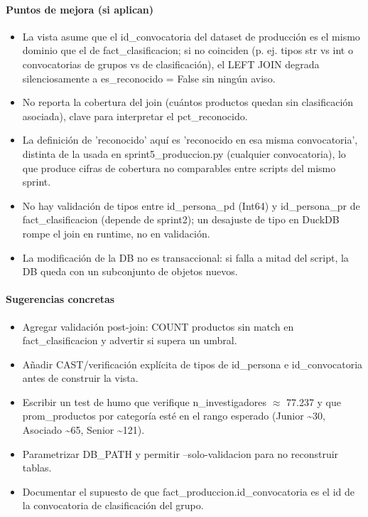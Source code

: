 \paragraph{Puntos de mejora (si aplican)}
\begin{itemize}
  \item La vista asume que el id\_convocatoria del dataset de producción es el mismo dominio que el de fact\_clasificacion; si no coinciden (p. ej. tipos str vs int o convocatorias de grupos vs de clasificación), el LEFT JOIN degrada silenciosamente a es\_reconocido = False sin ningún aviso.
  \item No reporta la cobertura del join (cuántos productos quedan sin clasificación asociada), clave para interpretar el pct\_reconocido.
  \item La definición de 'reconocido' aquí es 'reconocido en esa misma convocatoria', distinta de la usada en sprint5\_produccion.py (cualquier convocatoria), lo que produce cifras de cobertura no comparables entre scripts del mismo sprint.
  \item No hay validación de tipos entre id\_persona\_pd (Int64) y id\_persona\_pr de fact\_clasificacion (depende de sprint2); un desajuste de tipo en DuckDB rompe el join en runtime, no en validación.
  \item La modificación de la DB no es transaccional: si falla a mitad del script, la DB queda con un subconjunto de objetos nuevos.
\end{itemize}

\paragraph{Sugerencias concretas}
\begin{itemize}
  \item Agregar validación post-join: COUNT productos sin match en fact\_clasificacion y advertir si supera un umbral.
  \item Añadir CAST/verificación explícita de tipos de id\_persona e id\_convocatoria antes de construir la vista.
  \item Escribir un test de humo que verifique n\_investigadores $\approx$ 77.237 y que prom\_productos por categoría esté en el rango esperado (Junior \textasciitilde{}30, Asociado \textasciitilde{}65, Senior \textasciitilde{}121).
  \item Parametrizar DB\_PATH y permitir --solo-validacion para no reconstruir tablas.
  \item Documentar el supuesto de que fact\_produccion.id\_convocatoria es el id de la convocatoria de clasificación del grupo.
\end{itemize}

